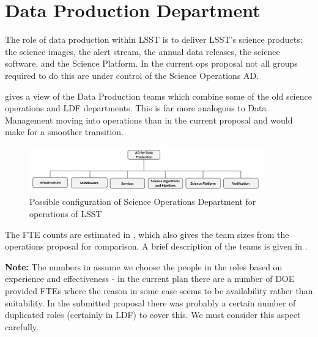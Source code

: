 \newpage
\section{Data Production Department }\label{sec:sciops} \label{sec:dataprod}

The role of data production within \gls{LSST} is to deliver \gls{LSST}'s science products: the science images, the alert stream, the annual data releases, the science \gls{software}, and the \gls{Science Platform}. In the current ops proposal not all groups required to do this are under control of the Science Operations \gls{AD}.

 gives a view of the Data Production teams which combine some of the old science operations  and \gls{LDF} departments. This is far more analogous to \gls{Data Management} moving into operations than in the current proposal and would make for a smoother transition.

\begin{figure}
\begin{center}
\includegraphics[width=0.9\textwidth,trim=0cm 0cm 0 0, clip]{figures/SciOpsOrg2.png}
\caption{Possible \gls{configuration} of Science \gls{Operations} Department for operations of \gls{LSST} \label{fig:sciopsorg}}
\end{center}
\end{figure}

The \gls{FTE} counts are estimated in , which also gives the team sizes from the operations proposal for comparison.
A brief description of the teams is given in .


{\bf Note:} The numbers in  assume we choose the people in the roles based on experience and effectiveness - in the current plan there are a number of \gls{DOE} provided FTEs where the reason in some case seems to be availability rather than suitability. In the submitted proposal there was probably a certain number of duplicated roles (certainly in \gls{LDF}) to cover this. We must consider this aspect carefully.



